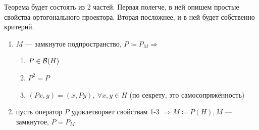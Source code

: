 \documentclass[document]{subfiles}
\begin{document}
\begin{theorem}
    Теорема будет состоять из 2 частей. Первая полегче, в ней опишем простые свойства ортогонального проектора. Вторая посложнее, и в ней будет собственно критерий.
    \begin{enumerate}
        \item $M$ --- замкнутое подпространство, $P \coloneqq P_M \Rightarrow$ 
        \begin{enumerate}
            \item $P \in \mathcal{B}(H)$
            \item $P^2 = P$
            \item $(Px,y) = (x,Py), \: \forall x,y \in  H$ (по секрету, это самосопряжённость) 
        \end{enumerate}
        \item пусть оператор $P$ удовлетворяет свойствам 1-3 $\Rightarrow M \coloneqq P(H), M$ --- замкнутое, $P = P_M$
    \end{enumerate}
\end{theorem}
\end{document}
